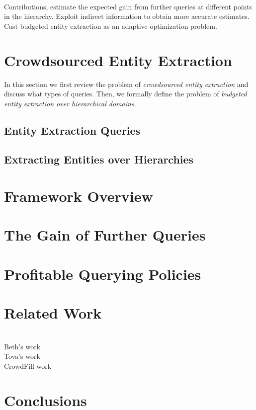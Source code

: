 \documentclass{sig-alternate}
\begin{document}
\ \\Contributions, estimate the expected gain from further queries at different points in the hierarchy. Exploit indirect information to obtain more accurate estimates. Cast budgeted entity extraction as an adaptive optimization problem. 


\section{Crowdsourced Entity Extraction}
In this section we first review the problem of {\em crowdsourced entity extraction} and discuss what types of queries. Then, we formally define the problem of {\em budgeted entity extraction over hierarchical domains}. 

\subsection{Entity Extraction Queries}

\subsection{Extracting Entities over Hierarchies}

\section{Framework Overview}
\subsection{}
\subsection{}
\subsection{}

\section{The Gain of Further Queries}

\section{Profitable Querying Policies}

\section{Related Work}

\ \\Beth's work
\ \\Tova's work
\ \\CrowdFill work

\section{Conclusions}




\end{document}
